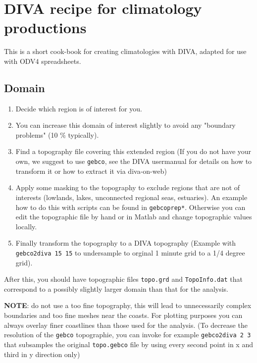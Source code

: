 \documentclass[8pt,a4paper,notitlepage]{book}
\newcommand{\diva}{DIVA}
\newcommand{\Diva}{DIVA}
\begin{document}
\chapter{DIVA recipe for climatology productions}


This is a short cook-book for creating climatologies with \Diva, adapted for use with ODV4 spreadsheets.




\section{Domain}

\begin{enumerate}
\item Decide which region is of interest for you. 
\item You can increase this domain of interest slightly to avoid any "boundary problems" (10 \% typically).
\item Find a topography file covering this extended region (If you do not have your own, we suggest to use {\tt gebco},  see the {\diva} usermanual for details on how to transform it or how to extract it via diva-on-web)
\item Apply some masking to the topography to exclude regions that are not of interests (lowlands, lakes, unconnected regional seas, estuaries). An example how to do this with scripts can be found in {\tt gebcoprep*}. Otherwise you can edit the topographic file by hand or in Matlab and change topographic values locally.
\item Finally transform the topography to a {\diva}   topography (Example with {\tt gebco2diva 15 15} to undersample to orginal 1 minute grid to a 1/4 degree grid).
\end{enumerate}

After this, you should have topographic files {\tt topo.grd} and {\tt TopoInfo.dat} that correspond to a possibly slightly larger domain than that for the analysis.


{\bf NOTE}: do not use a too fine topography, this will lead to unnecessarily complex boundaries and too fine meshes near the coasts. For plotting purposes you can always overlay finer coastlines than those used for the analysis.
(To decrease the resolution of the {\tt gebco} topographie, you can invoke for example {\tt gebco2diva 2 3} that subsamples the original {\tt topo.gebco} file  by using every second point in x and third in y direction only)

\end{document}
